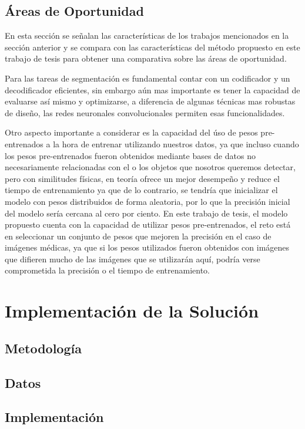 \section{Áreas de Oportunidad}
En esta sección se señalan las características de los trabajos mencionados en la sección anterior y se compara con las características del método propuesto en este trabajo de tesis para obtener una comparativa sobre las áreas de oportunidad.

Para las tareas de segmentación es fundamental contar con un codificador y un decodificador eficientes, sin embargo aún mas importante es tener la capacidad de evaluarse así mismo y optimizarse, a diferencia de algunas técnicas mas robustas de diseño, las redes neuronales convolucionales permiten esas funcionalidades.

Otro aspecto importante a considerar es la capacidad del úso de pesos pre-entrenados a la hora de entrenar utilizando nuestros datos, ya que incluso cuando los pesos pre-entrenados fueron obtenidos mediante bases de datos no necesariamente relacionadas con el o los objetos que nosotros queremos detectar, pero con similitudes físicas, en teoría ofrece un mejor desempeño y reduce el tiempo de entrenamiento ya que de lo contrario, se tendría que inicializar el modelo con pesos distribuidos de forma aleatoria, por lo que la precisión inicial del modelo sería cercana al cero por ciento. En este trabajo de tesis, el modelo propuesto cuenta con la capacidad de utilizar pesos pre-entrenados, el reto está en seleccionar un conjunto de pesos que mejoren la precisión en el caso de imágenes médicas, ya que si los pesos utilizados fueron obtenidos con imágenes que difieren mucho de las imágenes que se utilizarán aquí, podría verse comprometida la precisión o el tiempo de entrenamiento.

\chapter{Implementación de la Solución}

\section{Metodología}

\section{Datos}

\section{Implementación}


